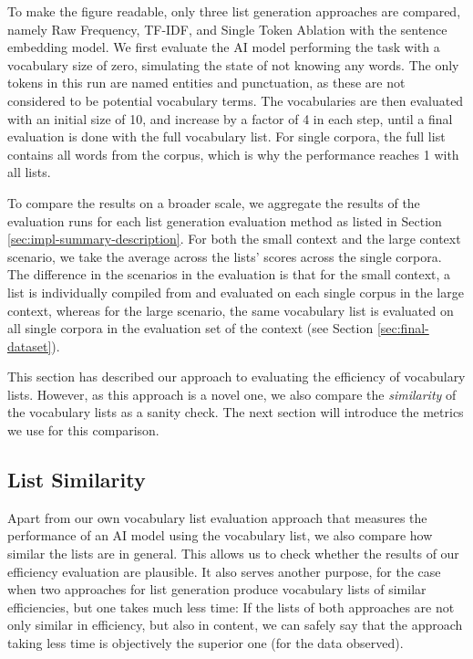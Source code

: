 To make the figure readable, only three list generation approaches are compared, namely Raw Frequency, TF-IDF, and Single Token Ablation with the sentence embedding model.
We first evaluate the AI model performing the task with a vocabulary size of zero, simulating the state of not knowing any words.
The only tokens in this run are named entities and punctuation, as these are not considered to be potential vocabulary terms.
The vocabularies are then evaluated with an initial size of 10, and increase by a factor of 4 in each step, until a final evaluation is done with the full vocabulary list.
For single corpora, the full list contains all words from the corpus, which is why the performance reaches 1 with all lists.

To compare the results on a broader scale, we aggregate the results of the evaluation runs for each list generation evaluation method as listed in Section \ref{sec:impl-summary-description}.
For both the small context and the large context scenario, we take the average across the lists' scores across the single corpora.
The difference in the scenarios in the evaluation is that for the small context, a list is individually compiled from and evaluated on each single corpus in the large context, whereas for the large scenario, the same vocabulary list is evaluated on all single corpora in the evaluation set of the context (see Section \ref{sec:final-dataset}).

This section has described our approach to evaluating the efficiency of vocabulary lists.
However, as this approach is a novel one, we also compare the \textit{similarity} of the vocabulary lists as a sanity check.
The next section will introduce the metrics we use for this comparison.

\subsection{List Similarity} \label{sec:list-similarity-measure}
Apart from our own vocabulary list evaluation approach that measures the performance of an AI model using the vocabulary list, we also compare how similar the lists are in general.
This allows us to check whether the results of our efficiency evaluation are plausible.
It also serves another purpose, for the case when two approaches for list generation produce vocabulary lists of similar efficiencies, but one takes much less time:
If the lists of both approaches are not only similar in efficiency, but also in content, we can safely say that the approach taking less time is objectively the superior one (for the data observed).

